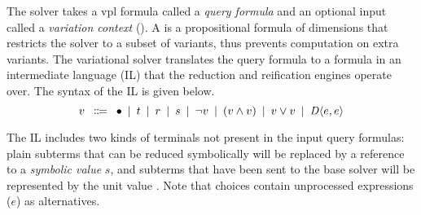 The solver takes a \ac{vpl} formula called a \emph{query formula} and an
optional input called a \emph{variation context} (\vc{}). A \vc{} is a
propositional formula of dimensions that restricts the solver to a subset of
variants, thus prevents computation on extra variants.
%
The variational solver translates the query formula to a formula in an
intermediate language (IL) that the reduction and reification engines operate
over. The syntax of the IL is given below.
%
\[
  v \hquad \Coloneqq\hquad \unit{}
  \hquad|\hquad t
  \hquad|\hquad r
  \hquad|\hquad s
  \hquad|\hquad \neg v
  \hquad|\hquad (v \wedge v)
  \hquad|\hquad v \vee v
  \hquad|\hquad \chc[D]{e,e}
\]
%

The IL includes two kinds of terminals not present in the input query formulas:
plain subterms that can be reduced symbolically will be replaced by a reference
to a \emph{symbolic value} $s$, and subterms that have been sent to the base
solver will be represented by the unit value \unit{}.
%
Note that choices contain unprocessed expressions ($e$) as alternatives.



